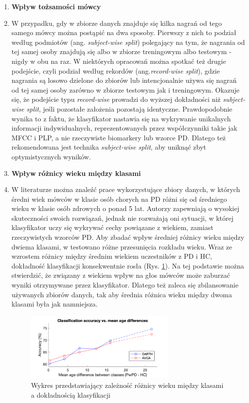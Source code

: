 \begin{enumerate}[label={\alph*)}]
	\item \textbf{Wpływ tożsamości mówcy}
	\item[] W przypadku, gdy w zbiorze danych znajduje się kilka nagrań od tego samego mówcy można postąpić na dwa sposoby.
Pierwszy z nich to podział według podmiotów (ang. \emph{subject-wise split}) polegający na tym, że nagrania od tej samej
osoby znajdują się albo w zbiorze treningowym albo testowym - nigdy w obu na raz.
W niektórych opracowań można spotkać też drugie podejście, czyli podział według rekordów (ang.\emph{record-wise split}), gdzie nagrania są losowo dzielone do zbiorów
lub intencjonalnie używa się nagrań od tej samej osoby zarówno w zbiorze testowym jak i treningowym.
Okazuje się, że podejście typu \emph{record-wise} prowadzi do wyższej dokładności niż \emph{subject-wise split}, jeśli pozostałe założenia pozostają identyczne.
Prawdopodobnie wynika to z faktu, że klasyfikator nastawia się na wykrywanie unikalnych informacji indywidualnych,
reprezentowanych przez współczynniki takie jak MFCC i PLP, a nie rzeczywiste biomarkery lub wzorce PD.
Dlatego też rekomendowana jest technika \emph{subject-wise split}, aby uniknąć zbyt optymistycznych wyników.

  	\item \textbf{Wpływ różnicy wieku między klasami}
	\item[] W literaturze można znaleźć prace wykorzystujące zbiory danych, w których  średni wiek mówców
w klasie osób chorych na PD różni się od średniego wieku w klasie osób zdrowych o ponad 5 lat.
Autorzy zapewniają o wysokiej skuteczności  swoich rozwiązań, jednak nie rozważają oni sytuacji, w której klasyfikator
uczy się wykrywać cechy powiązane z wiekiem, zamiast rzeczywistych wzorców PD.
Aby zbadać wpływ średniej różnicy wieku między dwiema klasami, w \cite{SustainedVowelsProblems} testowano różne przesunięcia rozkładu wieku.
Wraz ze wzrostem różnicy między średnim wiekiem uczestników z PD i HC, dokładność klasyfikacji konsekwentnie rosła (Rys. \ref{fig:acc_and_age_diff}).
Na tej podstawie można stwierdzić, że związany z wiekiem wpływ na głos mówców może zaburzać wyniki otrzymywane przez klasyfikator.
Dlatego też zaleca się zbilansowanie używanych zbiorów danych, tak aby średnia różnica wieku między dwoma klasami  była jak namniejsza.


\begin{figure}[htbp]
	\centering
	\includegraphics[width=0.7\textwidth]{./img/acc_and_age_difference}
	\caption{Wykres przedstawiający zależność różnicy wieku między klasami a dokładnością klasyfikacji \cite{SustainedVowelsProblems}}
    \label{fig:acc_and_age_diff}
\end{figure}


\end{enumerate}

